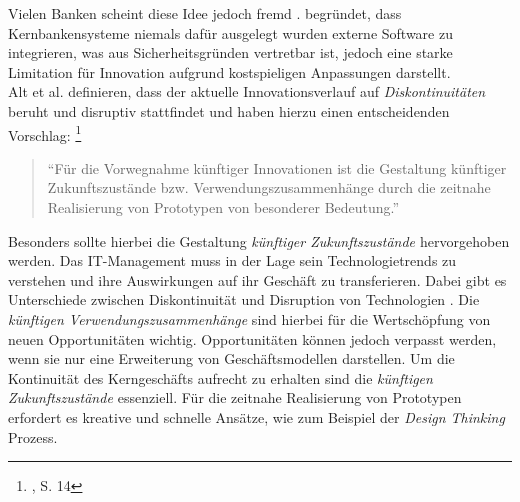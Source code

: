 Vielen Banken scheint diese Idee jedoch fremd \cite{Eismann2015}.
\citet{Eismann2015} begründet, dass Kernbankensysteme niemals dafür ausgelegt wurden externe Software zu integrieren, was aus Sicherheitsgründen vertretbar ist, jedoch eine starke Limitation für Innovation aufgrund kostspieligen Anpassungen darstellt.
\medskip
\\
Alt et al. \cite{Alt2017} definieren, dass der aktuelle Innovationsverlauf auf \emph{Diskontinuitäten} beruht und disruptiv stattfindet und haben hierzu einen entscheidenden Vorschlag: \footnote{\citet{Alt2017}, S. 14}
\begin{quote}
\enquote{Für die Vorwegnahme künftiger Innovationen ist die Gestaltung künftiger
Zukunftszustände bzw. Verwendungszusammenhänge durch die zeitnahe Realisierung von Prototypen von besonderer Bedeutung.}
\end{quote}
Besonders sollte hierbei die Gestaltung \emph{künftiger Zukunftszustände \cite{Alt2017}} hervorgehoben werden. Das IT-Management muss in der Lage sein Technologietrends zu verstehen und ihre Auswirkungen auf ihr Geschäft zu transferieren. Dabei gibt es Unterschiede zwischen Diskontinuität und Disruption von Technologien \cite{Fernandez:2020}.  Die \emph{künftigen Verwendungszusammenhänge} sind hierbei für die Wertschöpfung von neuen Opportunitäten wichtig. Opportunitäten können jedoch verpasst werden, wenn sie nur eine Erweiterung von Geschäftsmodellen darstellen. Um die Kontinuität des Kerngeschäfts aufrecht zu erhalten sind die \emph{künftigen Zukunftszustände \cite{Alt2017}} essenziell. Für die zeitnahe Realisierung von Prototypen erfordert es kreative \cite{Alt2017} und schnelle Ansätze, wie zum Beispiel der \emph{Design Thinking} Prozess.

